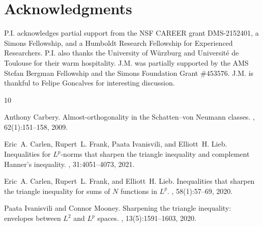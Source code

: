 \documentclass[11pt]{article}
\theoremstyle{definition}
\newcommand{\1}{\mathbf{1}}
\begin{document}
\section*{Acknowledgments}

P.I. acknowledges partial support from the NSF CAREER grant DMS-2152401, a Simons Fellowship, and a Humboldt Research Fellowship for Experienced Researchers. P.I. also thanks the University of W\"{u}rzburg and Universit\'e de Toulouse for their warm hospitality. J.M. was partially supported by the AMS Stefan Bergman Fellowship and the Simons Foundation Grant $\# 453576$. J.M. is thankful to Felipe Goncalves for interesting discussion.










\begin{thebibliography}{10}

Anthony Carbery.
\newblock Almost-orthogonality in the {S}chatten--von {N}eumann classes.
, 62(1):151--158, 2009.





Eric~A. Carlen, Rupert~L. Frank, Paata Ivanisvili, and Elliott~H. Lieb.
\newblock Inequalities for {$L^p$}-norms that sharpen the triangle inequality
  and complement {H}anner's inequality.
,
  31:4051--4073, 2021.


Eric~A. Carlen, Rupert~L. Frank, and Elliott~H. Lieb.
\newblock Inequalities that sharpen the triangle inequality for sums of {$N$}
  functions in {$L^p$}.
,
  58(1):57--69, 2020.

Paata Ivanisvili and Connor Mooney.
\newblock Sharpening the triangle inequality: envelopes between {$L^2$} and {$L^p$} spaces.
, 13(5):1591--1603, 2020.





\end{thebibliography}
\end{document}
